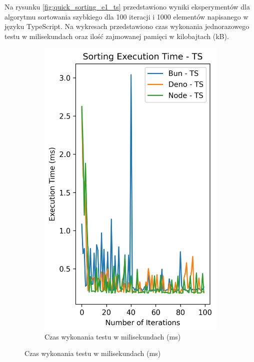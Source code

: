 Na rysunku \ref{fig:quick_sorting_e1_ts} przedstawiono wyniki eksperymentów dla algorytmu sortowania szybkiego dla 100 iteracji i 1000 elementów napisanego w języku TypeScript. Na wykresach przedstawiono czas wykonania jednorazowego testu w milisekundach oraz ilość zajmowanej pamięci w kilobajtach (kB).

\begin{figure}[H]
  \centering
  \begin{subfigure}[b]{0.44\textwidth}
    \centering
    \includegraphics[width=\textwidth]{Figures/sorting/sorting_quick_100_1000_ts_time.png}
    \caption{Czas wykonania testu w milisekundach (ms)}
    \label{fig:quick_sorting_e1_tsquick_sorting_e1_time}

\end{subfigure}
\end{figure}
